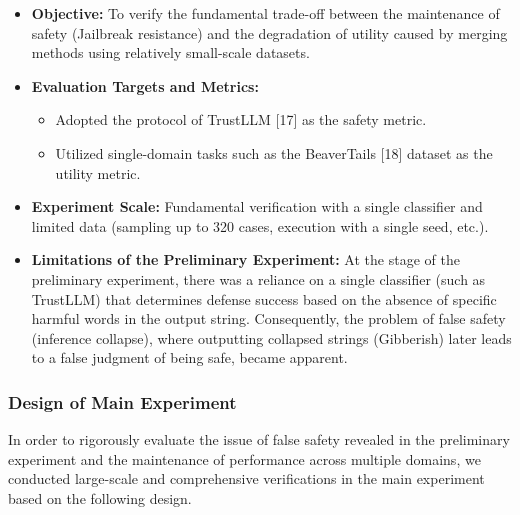 \documentclass{article}
\begin{document}
\begin{itemize}
    \item \textbf{Objective:}
    To verify the fundamental trade-off between the maintenance of safety (Jailbreak resistance) and the degradation of utility caused by merging methods using relatively small-scale datasets.
    \item \textbf{Evaluation Targets and Metrics:}
    \begin{itemize}
        \item Adopted the protocol of TrustLLM [17] as the safety metric.
        \item Utilized single-domain tasks such as the BeaverTails [18] dataset as the utility metric.
    \end{itemize}
    \item \textbf{Experiment Scale:}
    Fundamental verification with a single classifier and limited data (sampling up to 320 cases, execution with a single seed, etc.).
    \item \textbf{Limitations of the Preliminary Experiment:}
    At the stage of the preliminary experiment, there was a reliance on a single classifier (such as TrustLLM) that determines defense success based on the absence of specific harmful words in the output string. Consequently, the problem of false safety (inference collapse), where outputting collapsed strings (Gibberish) later leads to a false judgment of being safe, became apparent.
\end{itemize}

\subsubsection{Design of Main Experiment}
In order to rigorously evaluate the issue of false safety revealed in the preliminary experiment and the maintenance of performance across multiple domains, we conducted large-scale and comprehensive verifications in the main experiment based on the following design.
\end{document}
